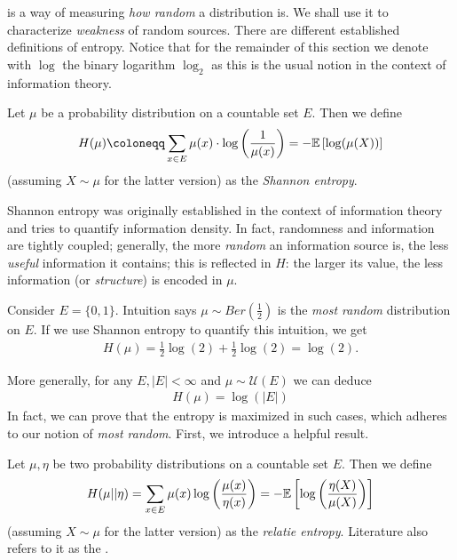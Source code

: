  is a way of measuring \emph{how random} a distribution is.
We shall use it to characterize \emph{weakness} of random sources.
There are different established definitions of entropy.
Notice that for the remainder of this section we denote with $\log$ the binary logarithm $\log_2$
as this is the usual notion in the context of information theory.
\begin{definition}
    Let $\mu$ be a probability distribution on a countable set $E$.
    Then we define
    \begin{align*}
        H(\mu) \coloneqq \sum_{x \in E}\mu(x) \cdot \log\left(\frac{1}{\mu(x)}\right)=-\expect{\log(\mu(X))}
    \end{align*}
    (assuming $X \sim \mu$ for the latter version) as the \emph{Shannon entropy}.
\end{definition}
Shannon entropy was originally established in the context of information theory and
tries to quantify information density.
In fact, randomness and information are tightly coupled; generally, the more \emph{random}
an information source is, the less \emph{useful} information it contains;
this is reflected in $H$: the larger its value, the less information (or \emph{structure}) is encoded in $\mu$.
\begin{example}
    Consider $E=\{0,1\}$.
    Intuition says $\mu \sim Ber(\frac{1}{2})$ is the \emph{most random} distribution on $E$.
    If we use Shannon entropy to quantify this intuition, we get
    \begin{align*}
        H(\mu) = \frac{1}{2}\log(2) + \frac{1}{2}\log(2) = \log(2).
    \end{align*}
\end{example}
More generally, for any $E, |E| < \infty$ and $\mu \sim \mathcal U(E)$ we can deduce
\begin{align*}
    H(\mu) = \log(|E|)
\end{align*}
In fact, we can prove that the entropy is maximized in such cases, which adheres to our notion of \emph{most random}.
First, we introduce a helpful result.
\begin{definition}
    Let $\mu, \eta$ be two probability distributions on a countable set $E$.
    Then we define
    \begin{align*}
        H(\mu || \eta) = \sum_{x \in E}\mu(x)\log\left(\frac{\mu(x)}{\eta(x)}\right) = -\mathbb{E}\left[\log\left(\frac{\eta(X)}{\mu(X)}\right)\right]
    \end{align*}
    (assuming $X \sim \mu$ for the latter version) as the \emph{relatie entropy}.
    Literature also refers to it as the .
\end{definition}

